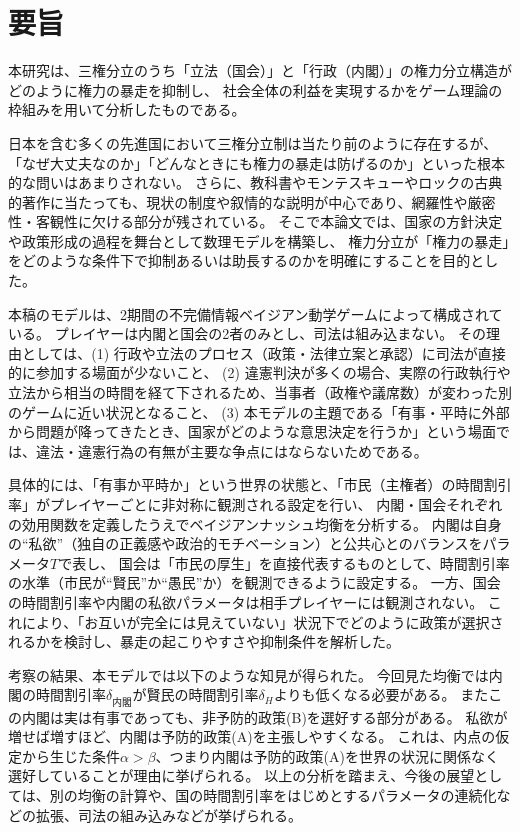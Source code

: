 \documentclass[main.tex]{subfiles}
\begin{document}
\section*{要旨}

本研究は、三権分立のうち「立法（国会）」と「行政（内閣）」の権力分立構造がどのように権力の暴走を抑制し、
社会全体の利益を実現するかをゲーム理論の枠組みを用いて分析したものである。

日本を含む多くの先進国において三権分立制は当たり前のように存在するが、「なぜ大丈夫なのか」「どんなときにも権力の暴走は防げるのか」といった根本的な問いはあまりされない。
さらに、教科書やモンテスキューやロックの古典的著作に当たっても、現状の制度や叙情的な説明が中心であり、網羅性や厳密性・客観性に欠ける部分が残されている。
そこで本論文では、国家の方針決定や政策形成の過程を舞台として数理モデルを構築し、
権力分立が「権力の暴走」をどのような条件下で抑制あるいは助長するのかを明確にすることを目的とした。

本稿のモデルは、2期間の不完備情報ベイジアン動学ゲームによって構成されている。
プレイヤーは内閣と国会の2者のみとし、司法は組み込まない。
その理由としては、(1) 行政や立法のプロセス（政策・法律立案と承認）に司法が直接的に参加する場面が少ないこと、
(2) 違憲判決が多くの場合、実際の行政執行や立法から相当の時間を経て下されるため、当事者（政権や議席数）が変わった別のゲームに近い状況となること、
(3) 本モデルの主題である「有事・平時に外部から問題が降ってきたとき、国家がどのような意思決定を行うか」という場面では、違法・違憲行為の有無が主要な争点にはならないためである。

具体的には、「有事か平時か」という世界の状態と、「市民（主権者）の時間割引率」がプレイヤーごとに非対称に観測される設定を行い、
内閣・国会それぞれの効用関数を定義したうえでベイジアンナッシュ均衡を分析する。
内閣は自身の“私欲”（独自の正義感や政治的モチベーション）と公共心とのバランスをパラメータ$T$で表し、
国会は「市民の厚生」を直接代表するものとして、時間割引率の水準（市民が“賢民”か“愚民”か）を観測できるように設定する。
一方、国会の時間割引率や内閣の私欲パラメータは相手プレイヤーには観測されない。
これにより、「お互いが完全には見えていない」状況下でどのように政策が選択されるかを検討し、暴走の起こりやすさや抑制条件を解析した。

考察の結果、本モデルでは以下のような知見が得られた。
今回見た均衡では内閣の時間割引率$\delta_{内閣}$が賢民の時間割引率$\delta_H$よりも低くなる必要がある。
またこの内閣は実は有事であっても、非予防的政策(B)を選好する部分がある。
私欲が増せば増すほど、内閣は予防的政策(A)を主張しやすくなる。
これは、内点の仮定から生じた条件$\alpha>\beta$、つまり内閣は予防的政策(A)を世界の状況に関係なく選好していることが理由に挙げられる。
以上の分析を踏まえ、今後の展望としては、別の均衡の計算や、国の時間割引率をはじめとするパラメータの連続化などの拡張、司法の組み込みなどが挙げられる。
\end{document}
